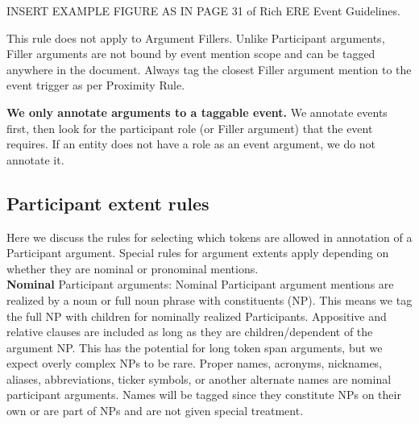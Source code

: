 INSERT EXAMPLE FIGURE AS IN PAGE 31 of Rich ERE Event Guidelines.

This rule does not apply to Argument Fillers.
Unlike Participant arguments, Filler arguments are not bound by event mention scope and can be tagged anywhere in the document.
Always tag the closest Filler argument mention to the event trigger as per Proximity Rule.

\noindent\textbf{We only annotate arguments to a taggable event.}
We annotate events first, then look for the participant role (or Filler argument) that the event requires. 
If an entity does not have a role as an event argument, we do not annotate it.\\

\subsection{Participant extent rules}
Here we discuss the rules for selecting which tokens are allowed in annotation of a Participant argument.
Special rules for argument extents apply depending on whether they are nominal or pronominal mentions.\\

\noindent\textbf{Nominal} Participant arguments:
Nominal Participant argument mentions are realized by a noun or full noun phrase with constituents (NP).
This means we tag the full NP with children for nominally realized Participants.
Appositive and relative clauses are included as long as they are children/dependent of the argument NP.
This has the potential for long token span arguments, but we expect overly complex NPs to be rare.
Proper names, acronyms, nicknames, aliases, abbreviations, ticker symbols, or another alternate names are nominal participant arguments.
Names will be tagged since they constitute NPs on their own or are part of NPs and are not given special treatment.

